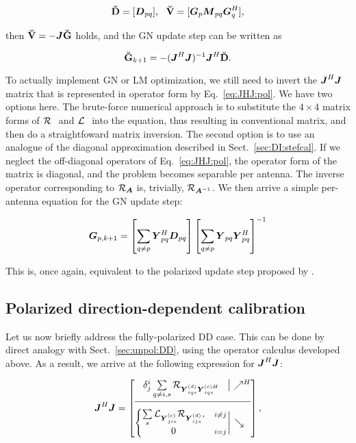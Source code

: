 \documentclass[useAMS,usenatbib]{mn2e}
\newcommand{\mat}[1]{{\bmath{#1}}}
\newcommand{\JJ}{\mat{J}} %
\newcommand{\DD}{\mat{D}}
\newcommand{\MM}{\mat{M}}
\newcommand{\GG}{\mat{G}}
\newcommand{\JHJ}{\JJ^H\JJ} %
\newcommand{\StefCal}{{\sc StefCal}}
\begin{document}
\[
\DDd = [ \DD_{pq} ],~~\VVv = [ \GG_p \MM_{pq} \GG_q^H ],
\]

then $\VVv = -\JJ \GGg$ holds, and the GN update step can be written as

\[
\GGg_{k+1} = - (\JHJ)^{-1} \JJ^H \DDd.
\]


To actually implement GN or LM optimization, we still need to invert the  $\JHJ$ matrix that is represented in operator form 
by Eq.~\ref{eq:JHJ:pol}. We have two options here. The brute-force numerical approach is to substitute the 
$4\times4$ matrix forms of $\mathcal{R}_{{~}}$ and $\mathcal{L}_{{~}}$ into the equation, thus resulting in conventional matrix,
and then do a straightfoward matrix inversion. The second option is to use an analogue of the diagonal 
approximation described in Sect.~\ref{sec:DI:stefcal}. If we neglect the off-diagonal operators of Eq.~\ref{eq:JHJ:pol}, 
the operator form of the matrix is diagonal, and the problem becomes separable per antenna. The inverse operator 
corresponding to $\Rop{\mat{A}}$ is, trivially, $\Rop{\mat{A}^{-1}}$. We then arrive a simple per-antenna equation 
for the GN update step:

\begin{equation}
\label{eq:update:DI:diag:pol}
\GG_{p,k+1} = \left [ \sum\limits_{q\ne p} \YY^H_{pq} \DD_{pq} \right ] 
\left [ \sum\limits_{q\ne p} \YY_{pq} \YY^H_{pq}  \right ]^{-1}
\end{equation}

This is, once again, equivalent to the polarized {\sc \StefCal} update step proposed by \citet{Stefcal}.




\subsection{Polarized direction-dependent calibration}

Let us now briefly address the fully-polarized DD case. This can be done by direct analogy with
Sect.~\ref{sec:unpol:DD}, using the operator calculus developed above. As a result, we arrive at the
following expression for $\JHJ$:

\begin{equation}
\label{eq:JHJ:DD:pol}
  \JHJ = \JHJblocks{
  \delta^i_j \sum\limits_{q\ne i,s} \Rop{\YYd_{iqs} \YYcH_{iqs}} 
  }{
  \left \{ 
  \begin{array}{@{}cc@{}}
   \sum\limits_{s} \Lop{ \YYc_{jis}  } \Rop{\YYd_{ijs}},&{\scriptstyle i\ne j} \\
   0 &{\scriptstyle i=j}
  \end{array} \right . 
  }
,
\end{equation}
\end{document}
